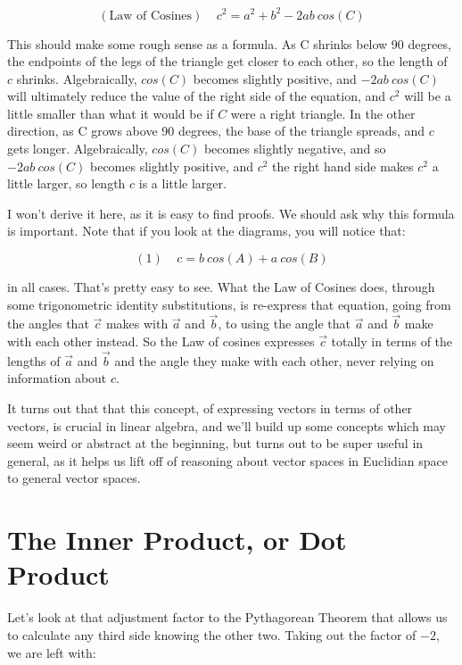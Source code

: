 \documentclass[
]{book}
\begin{document}
\[(\text{Law of Cosines}) \ \ \ \ \ c^2 = a^2 + b^2 - 2 a b \ cos(C)\]

This should make some rough sense as a formula. As C shrinks below 90 degrees, the endpoints of the legs of the triangle get closer to each other, so the length of \(c\) shrinks. Algebraically, \(cos(C)\) becomes slightly positive, and \(-2 a b \ cos(C)\) will ultimately reduce the value of the right side of the equation, and \(c^2\) will be a little smaller than what it would be if \(C\) were a right triangle. In the other direction, as C grows above 90 degrees, the base of the triangle spreads, and \(c\) gets longer. Algebraically, \(cos(C)\) becomes slightly negative, and so \(-2 a b \ cos(C)\) becomes slightly positive, and \(c^2\) the right hand side makes \(c^2\) a little larger, so length \(c\) is a little larger.

I won't derive it here, as it is easy to find proofs. We should ask why this formula is important. Note that if you look at the diagrams, you will notice that:

\[(1) \ \ \ \ \ c = b \ cos(A) + a \ cos(B)\]

in all cases. That's pretty easy to see. What the Law of Cosines does, through some trigonometric identity substitutions, is re-express that equation, going from the angles that \(\vec{c}\) makes with \(\vec{a}\) and \(\vec{b}\), to using the angle that \(\vec{a}\) and \(\vec{b}\) make with each other instead. So the Law of cosines expresses \(\vec{c}\) totally in terms of the lengths of \(\vec{a}\) and \(\vec{b}\) and the angle they make with each other, never relying on information about \(c\).

It turns out that that this concept, of expressing vectors in terms of other vectors, is crucial in linear algebra, and we'll build up some concepts which may seem weird or abstract at the beginning, but turns out to be super useful in general, as it helps us lift off of reasoning about vector spaces in Euclidian space to general vector spaces.

\hypertarget{the-inner-product-or-dot-product}{%
\section{The Inner Product, or Dot Product}\label{the-inner-product-or-dot-product}}

Let's look at that adjustment factor to the Pythagorean Theorem that allows us to calculate any third side knowing the other two. Taking out the factor of \(-2\), we are left with:
\end{document}
